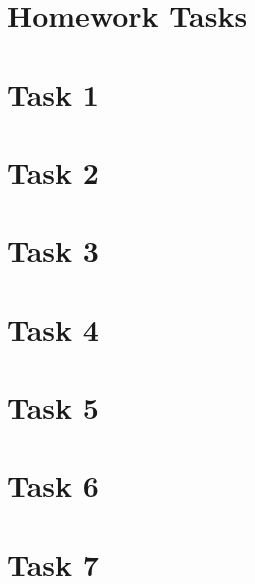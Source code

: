 \documentclass[10pt, a4paper]{article}
\begin{document}


\section*{Homework Tasks}

\pagebreak

\tableofcontents
\pagebreak

\section{Task 1}


\section{Task 2}


\section{Task 3}


\section{Task 4}


\section{Task 5}


\section{Task 6}


\section{Task 7}


%

\pagebreak

\printbibheading
\end{document}
